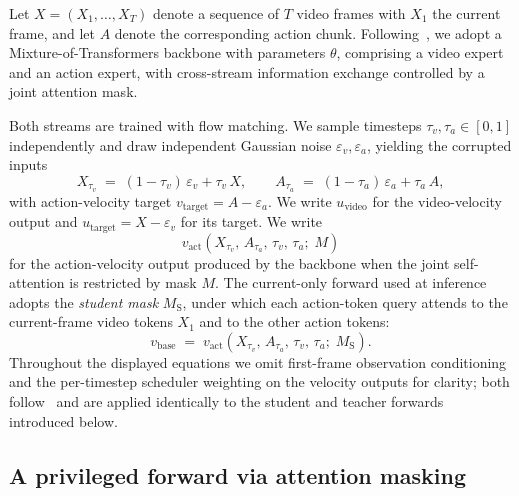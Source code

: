 \documentclass{article}
\begin{document}
Let $X = (X_1, \ldots, X_T)$ denote a sequence of $T$ video frames with $X_1$ the current frame, and let $A$ denote the corresponding action chunk. Following~\citet{yuan2026fastwam}, we adopt a Mixture-of-Transformers backbone with parameters $\theta$, comprising a video expert and an action expert, with cross-stream information exchange controlled by a joint attention mask.

Both streams are trained with flow matching. We sample timesteps $\tau_v, \tau_a \in [0,1]$ independently and draw independent Gaussian noise $\varepsilon_v, \varepsilon_a$, yielding the corrupted inputs
\begin{equation}
X_{\tau_v} \;=\; (1-\tau_v)\,\varepsilon_v + \tau_v\, X, \qquad A_{\tau_a} \;=\; (1-\tau_a)\,\varepsilon_a + \tau_a\, A,
\label{eq:corrupted-inputs}
\end{equation}
with action-velocity target $v_\mathrm{target} = A - \varepsilon_a$. We write $u_\mathrm{video}$ for the video-velocity output and $u_\mathrm{target} = X - \varepsilon_v$ for its target. We write
\[
v_\mathrm{act}\!\left(X_{\tau_v},\, A_{\tau_a},\, \tau_v,\, \tau_a;\; M\right)
\]
for the action-velocity output produced by the backbone when the joint self-attention is restricted by mask $M$. The current-only forward used at inference adopts the \emph{student mask} $M_\mathrm{S}$, under which each action-token query attends to the current-frame video tokens $X_1$ and to the other action tokens:
\begin{equation}
v_\mathrm{base} \;=\; v_\mathrm{act}\!\left(X_{\tau_v},\, A_{\tau_a},\, \tau_v,\, \tau_a;\; M_\mathrm{S}\right).
\label{eq:v-base}
\end{equation}
Throughout the displayed equations we omit first-frame observation conditioning and the per-timestep scheduler weighting on the velocity outputs for clarity; both follow~\citet{yuan2026fastwam} and are applied identically to the student and teacher forwards introduced below.

\subsection{A privileged forward via attention masking}
\label{sec:method:privileged}
\end{document}
